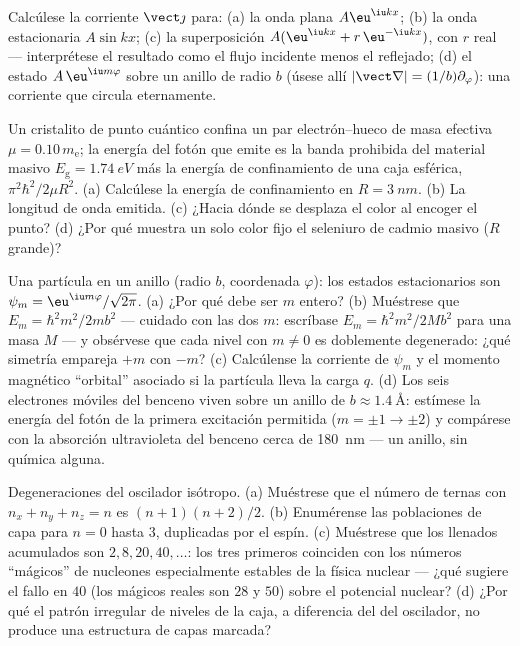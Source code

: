 \begin{exercise}[$\star$]\label{exo:b3:schrodinger-three-dimensions:3}
Calcúlese la corriente $\vect\jmath$ para: (a) la onda plana
$A\eu^{\iu kx}$; (b) la onda estacionaria $A\sin kx$; (c) la
superposición $A(\eu^{\iu kx} + r\,\eu^{-\iu kx})$, con $r$ real ---
interprétese el resultado como el flujo incidente menos el reflejado; (d) el
estado $A\,\eu^{\iu m\varphi}$ sobre un anillo de radio $b$ (úsese allí $|\vect\nabla|
= (1/b)\partial_\varphi$): una corriente que circula eternamente.
\end{exercise}

\begin{exercise}[$\star$]\label{exo:b3:schrodinger-three-dimensions:4}
Un cristalito de punto cuántico confina un par electrón--hueco de masa
efectiva $\mu = 0.10\,m_{\text{e}}$; la energía del fotón que emite es la
banda prohibida del material masivo $E_{\text{g}} = \qty{1.74}{eV}$ más la
energía de confinamiento de una caja esférica, $\pi^2\hbar^2/2\mu R^2$. (a)
Calcúlese la energía de confinamiento en $R = \qty{3}{nm}$. (b) La longitud de
onda emitida. (c) ¿Hacia dónde se desplaza el color al encoger el punto? (d)
¿Por qué muestra un solo color fijo el seleniuro de cadmio masivo ($R$
grande)?
\end{exercise}

\begin{exercise}[$\star\star$]\label{exo:b3:schrodinger-three-dimensions:5}
Una partícula en un anillo (radio $b$, coordenada $\varphi$): los estados
estacionarios son $\psi_m = \eu^{\iu m\varphi}/\sqrt{2\pi}$. (a)
¿Por qué debe ser $m$ entero? (b) Muéstrese que $E_m = \hbar^2m^2/2mb^2$ ---
cuidado con las dos $m$: escríbase $E_m = \hbar^2 m^2/2Mb^2$ para una masa
$M$ --- y obsérvese que cada nivel con $m \neq 0$ es doblemente degenerado:
¿qué simetría empareja $+m$ con $-m$? (c) Calcúlense la corriente de
$\psi_m$ y el momento magnético ``orbital'' asociado si la partícula lleva
la carga $q$. (d) Los seis electrones móviles del benceno viven sobre un
anillo de $b \approx \qty{1.4}{\angstrom}$: estímese la energía del fotón de
la primera excitación permitida ($m = \pm1 \to \pm2$) y compárese con la
absorción ultravioleta del benceno cerca de \qty{180}{nm} --- un anillo, sin
química alguna.
\end{exercise}

\begin{exercise}[$\star\star$]\label{exo:b3:schrodinger-three-dimensions:6}
Degeneraciones del oscilador isótropo. (a) Muéstrese que el número de
ternas con $n_x + n_y + n_z = n$ es $(n+1)(n+2)/2$. (b) Enumérense las
poblaciones de capa para $n = 0$ hasta $3$, duplicadas por el espín. (c)
Muéstrese que los llenados acumulados son $2, 8, 20, 40, \dots$: los tres
primeros coinciden con los números ``mágicos'' de nucleones especialmente
estables de la física nuclear --- ¿qué sugiere el fallo en $40$ (los mágicos
reales son $28$ y $50$) sobre el potencial nuclear? (d) ¿Por qué el patrón
irregular de niveles de la caja, a diferencia del del oscilador, no produce
una estructura de capas marcada?
\end{exercise}

